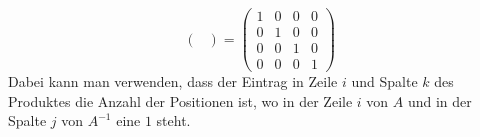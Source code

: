 \begin{loesung}
\begin{teilaufgaben}
\[\begin{pmatrix}
\end{pmatrix}
=
\begin{pmatrix}
   1 & 0 & 0 & 0 \\
   0 & 1 & 0 & 0 \\
   0 & 0 & 1 & 0 \\
   0 & 0 & 0 & 1 
\end{pmatrix}
\]
Dabei kann man verwenden, dass der Eintrag in Zeile $i$ und Spalte $k$ des
Produktes die Anzahl der Positionen ist, wo in der Zeile $i$ von $A$
und in der Spalte $j$ von $A^{-1}$ eine $1$ steht.
\end{teilaufgaben}
\end{loesung}
